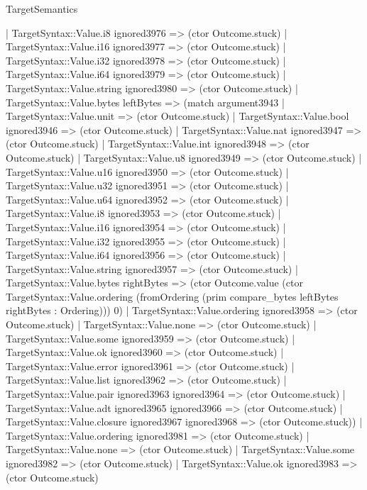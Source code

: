 \begin{lexlean}{TargetSemantics}
\begin{semanticmodule}
{            | TargetSyntax::Value.i8 ignored3976 => (ctor Outcome.stuck)
            | TargetSyntax::Value.i16 ignored3977 => (ctor Outcome.stuck)
            | TargetSyntax::Value.i32 ignored3978 => (ctor Outcome.stuck)
            | TargetSyntax::Value.i64 ignored3979 => (ctor Outcome.stuck)
            | TargetSyntax::Value.string ignored3980 => (ctor Outcome.stuck)
            | TargetSyntax::Value.bytes leftBytes => (match argument3943
              | TargetSyntax::Value.unit => (ctor Outcome.stuck)
              | TargetSyntax::Value.bool ignored3946 => (ctor Outcome.stuck)
              | TargetSyntax::Value.nat ignored3947 => (ctor Outcome.stuck)
              | TargetSyntax::Value.int ignored3948 => (ctor Outcome.stuck)
              | TargetSyntax::Value.u8 ignored3949 => (ctor Outcome.stuck)
              | TargetSyntax::Value.u16 ignored3950 => (ctor Outcome.stuck)
              | TargetSyntax::Value.u32 ignored3951 => (ctor Outcome.stuck)
              | TargetSyntax::Value.u64 ignored3952 => (ctor Outcome.stuck)
              | TargetSyntax::Value.i8 ignored3953 => (ctor Outcome.stuck)
              | TargetSyntax::Value.i16 ignored3954 => (ctor Outcome.stuck)
              | TargetSyntax::Value.i32 ignored3955 => (ctor Outcome.stuck)
              | TargetSyntax::Value.i64 ignored3956 => (ctor Outcome.stuck)
              | TargetSyntax::Value.string ignored3957 => (ctor Outcome.stuck)
              | TargetSyntax::Value.bytes rightBytes => (ctor Outcome.value (ctor TargetSyntax::Value.ordering (fromOrdering (prim compare_bytes leftBytes rightBytes : Ordering))) 0)
              | TargetSyntax::Value.ordering ignored3958 => (ctor Outcome.stuck)
              | TargetSyntax::Value.none => (ctor Outcome.stuck)
              | TargetSyntax::Value.some ignored3959 => (ctor Outcome.stuck)
              | TargetSyntax::Value.ok ignored3960 => (ctor Outcome.stuck)
              | TargetSyntax::Value.error ignored3961 => (ctor Outcome.stuck)
              | TargetSyntax::Value.list ignored3962 => (ctor Outcome.stuck)
              | TargetSyntax::Value.pair ignored3963 ignored3964 => (ctor Outcome.stuck)
              | TargetSyntax::Value.adt ignored3965 ignored3966 => (ctor Outcome.stuck)
              | TargetSyntax::Value.closure ignored3967 ignored3968 => (ctor Outcome.stuck))
            | TargetSyntax::Value.ordering ignored3981 => (ctor Outcome.stuck)
            | TargetSyntax::Value.none => (ctor Outcome.stuck)
            | TargetSyntax::Value.some ignored3982 => (ctor Outcome.stuck)
            | TargetSyntax::Value.ok ignored3983 => (ctor Outcome.stuck)
}
\end{semanticmodule}
\end{lexlean}
